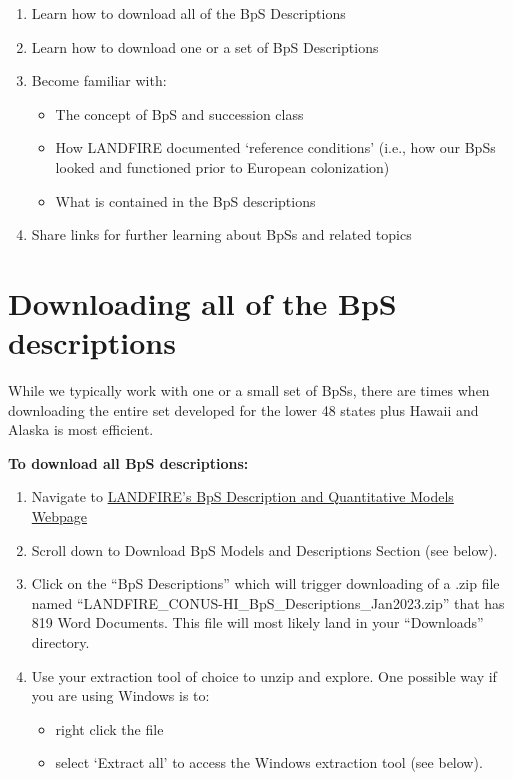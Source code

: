 \documentclass[
  letterpaper,
  DIV=11,
  numbers=noendperiod]{scrreprt}
\providecommand{\tightlist}{%
  \setlength{\itemsep}{0pt}\setlength{\parskip}{0pt}}\usepackage{longtable,booktabs,array}
\begin{document}
\begin{enumerate}
\def\labelenumi{\arabic{enumi}.}
\tightlist
\item
  Learn how to download all of the BpS Descriptions
\item
  Learn how to download one or a set of BpS Descriptions
\item
  Become familiar with:

  \begin{itemize}
  \tightlist
  \item
    The concept of BpS and succession class
  \item
    How LANDFIRE documented `reference conditions' (i.e., how our BpSs
    looked and functioned prior to European colonization)
  \item
    What is contained in the BpS descriptions
  \end{itemize}
\item
  Share links for further learning about BpSs and related topics
\end{enumerate}

\hypertarget{downloading-all-of-the-bps-descriptions}{%
\section{Downloading all of the BpS
descriptions}\label{downloading-all-of-the-bps-descriptions}}

While we typically work with one or a small set of BpSs, there are times
when downloading the entire set developed for the lower 48 states plus
Hawaii and Alaska is most efficient.

\textbf{To download all BpS descriptions:}

\begin{enumerate}
\def\labelenumi{\arabic{enumi}.}
\tightlist
\item
  Navigate to \href{shttps://landfire.gov/bps-models.php}{LANDFIRE's BpS
  Description and Quantitative Models Webpage}
\item
  Scroll down to Download BpS Models and Descriptions Section (see
  below).
\item
  Click on the ``BpS Descriptions'' which will trigger downloading of a
  .zip file named ``LANDFIRE\_CONUS-HI\_BpS\_Descriptions\_Jan2023.zip''
  that has 819 Word Documents. This file will most likely land in your
  ``Downloads'' directory.
\item
  Use your extraction tool of choice to unzip and explore. One possible
  way if you are using Windows is to:

  \begin{itemize}
  \tightlist
  \item
    right click the file
  \item
    select `Extract all' to access the Windows extraction tool (see
    below).
  \end{itemize}
\end{enumerate}
\end{document}
